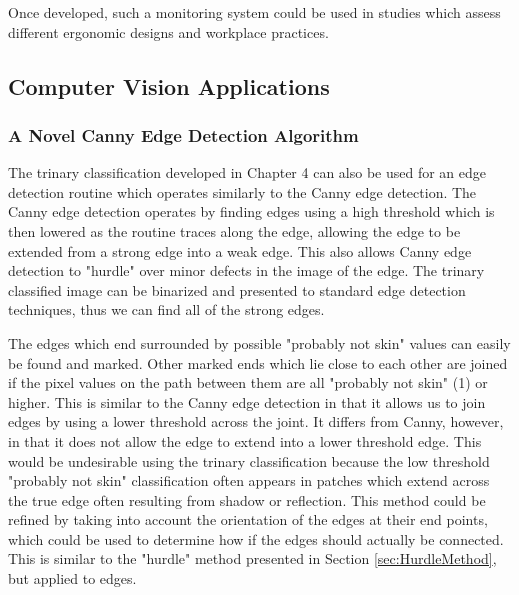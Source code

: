 Once developed, such a monitoring system could be used in studies which assess different ergonomic designs and workplace practices. 

\subsection{Computer Vision Applications}\label{sec:ComputerVisionApplications}

\subsubsection{A Novel Canny Edge Detection Algorithm}\label{sec:ANovelCannyEdgeDetectionAlgorithm}
The trinary classification developed in Chapter 4 can also be used for an edge detection routine which operates similarly to the Canny edge detection. The Canny edge detection operates by finding edges using a high threshold which is then lowered as the routine traces along the edge, allowing the edge to be extended from a strong edge into a weak edge. This also allows Canny edge detection to "hurdle" over minor defects in the image of the edge. The trinary classified image can be binarized and presented to standard edge detection techniques, thus we can find all of the strong edges. 

The edges which end surrounded by possible "probably not skin" values can easily be found and marked. Other marked ends which lie close to each other are joined if the pixel values on the path between them are all "probably not skin" (1) or higher. This is similar to the Canny edge detection in that it allows us to join edges by using a lower threshold across the joint. It differs from Canny, however, in that it does not allow the edge to extend into a lower threshold edge. This would be undesirable using the trinary classification because the low threshold "probably not skin" classification often appears in patches which extend across the true edge often resulting from shadow or reflection. This method could be refined by taking into account the orientation of the edges at their end points, which could be used to determine how if the edges should actually be connected. This is similar to the "hurdle" method presented in Section \ref{sec:HurdleMethod}, but applied to edges.

